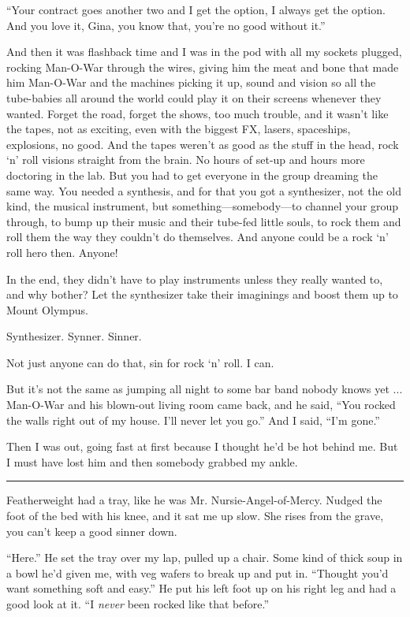 ``Your contract goes another two and I get the option, I always get the option. And you love it, Gina, you know that, you're no good without it.''

And then it was flashback time and I was in the pod with all my sockets plugged, rocking Man-O-War through the wires, giving him the meat and bone that made him Man-O-War and the machines picking it up, sound and vision so all the tube-babies all around the world could play it on their screens whenever they wanted. Forget the road, forget the shows, too much trouble, and it wasn't like the tapes, not as exciting, even with the biggest FX, lasers, spaceships, explosions, no good. And the tapes weren't as good as the stuff in the head, rock `n' roll visions straight from the brain. No hours of set-up and hours more doctoring in the lab. But you had to get everyone in the group dreaming the same way. You needed a synthesis, and for that you got a synthesizer, not the old kind, the musical instrument, but something—somebody—to channel your group through, to bump up their music and their tube-fed little souls, to rock them and roll them the way they couldn't do themselves. And anyone could be a rock `n' roll hero then. Anyone!

In the end, they didn't have to play instruments unless they really wanted to, and why bother? Let the synthesizer take their imaginings and boost them up to Mount Olympus.

Synthesizer. Synner. Sinner.

Not just anyone can do that, sin for rock `n' roll. I can.

But it's not the same as jumping all night to some bar band nobody knows yet ... Man-O-War and his blown-out living room came back, and he said, ``You rocked the walls right out of my house. I'll never let you go.''
And I said, ``I'm gone.''

Then I was out, going fast at first because I thought he'd be hot behind me. But I must have lost him and then somebody grabbed my ankle.

\fancybreak{* * *}

Featherweight had a tray, like he was Mr. Nursie-Angel-of-Mercy. Nudged the foot of the bed with his knee, and it sat me up slow. She rises from the grave, you can't keep a good sinner down.

``Here.'' He set the tray over my lap, pulled up a chair. Some kind of thick soup in a bowl he'd given me, with veg wafers to break up and put in. ``Thought you'd want something soft and easy.'' He put his left foot up on his right leg and had a good look at it. ``I \textit{never} been rocked like that before.''

